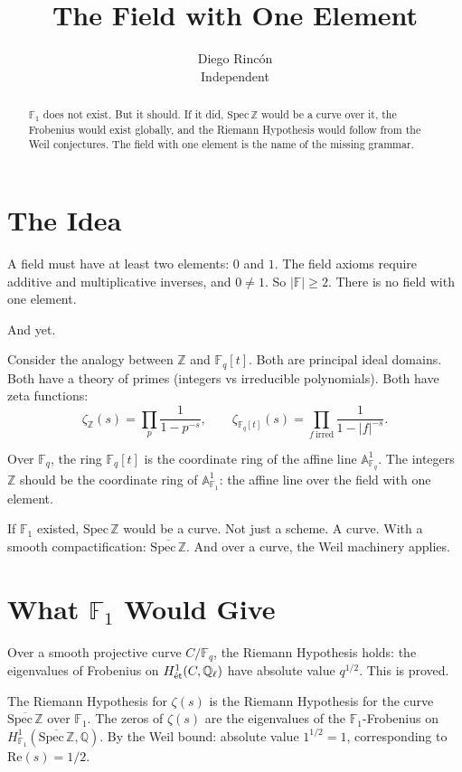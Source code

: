 \documentclass[12pt]{article}
\title{The Field with One Element}
\author{Diego Rinc\'on\\
\small Independent}
\date{}
\theoremstyle{definition}
\theoremstyle{remark}
\begin{document}
\maketitle

\begin{abstract}
$\mathbb{F}_1$ does not exist.
But it should.
If it did, $\mathrm{Spec}\,\mathbb{Z}$ would be a curve over it,
the Frobenius would exist globally,
and the Riemann Hypothesis would follow from the Weil conjectures.
The field with one element is the name of the missing grammar.
\end{abstract}

\section{The Idea}

A field must have at least two elements: $0$ and $1$.
The field axioms require additive and multiplicative inverses,
and $0 \neq 1$.
So $|\mathbb{F}| \geq 2$.
There is no field with one element.

And yet.

Consider the analogy between $\mathbb{Z}$ and $\mathbb{F}_q[t]$.
Both are principal ideal domains.
Both have a theory of primes (integers vs irreducible polynomials).
Both have zeta functions:
$$\zeta_{\mathbb{Z}}(s) = \prod_p \frac{1}{1-p^{-s}},\qquad
  \zeta_{\mathbb{F}_q[t]}(s) = \prod_{f\ \mathrm{irred}} \frac{1}{1-|f|^{-s}}.$$

Over $\mathbb{F}_q$, the ring $\mathbb{F}_q[t]$ is the coordinate ring
of the affine line $\mathbb{A}^1_{\mathbb{F}_q}$.
The integers $\mathbb{Z}$ should be the coordinate ring of
$\mathbb{A}^1_{\mathbb{F}_1}$: the affine line over the field with one element.

If $\mathbb{F}_1$ existed, $\mathrm{Spec}\,\mathbb{Z}$ would be a curve.
Not just a scheme. A curve.
With a smooth compactification: $\overline{\mathrm{Spec}\,\mathbb{Z}}$.
And over a curve, the Weil machinery applies.

\section{What $\mathbb{F}_1$ Would Give}

Over a smooth projective curve $C/\mathbb{F}_q$,
the Riemann Hypothesis holds: the eigenvalues of Frobenius
on $H^1_{\rm\acute{e}t}(C, \mathbb{Q}_\ell)$ have absolute value $q^{1/2}$.
This is proved.

The Riemann Hypothesis for $\zeta(s)$
is the Riemann Hypothesis for the curve $\overline{\mathrm{Spec}\,\mathbb{Z}}$
over $\mathbb{F}_1$.
The zeros of $\zeta(s)$ are the eigenvalues of the $\mathbb{F}_1$-Frobenius
on $H^1_{\mathbb{F}_1}(\overline{\mathrm{Spec}\,\mathbb{Z}}, \mathbb{Q})$.
By the Weil bound: absolute value $1^{1/2} = 1$,
corresponding to $\mathrm{Re}(s) = 1/2$.
\end{document}
